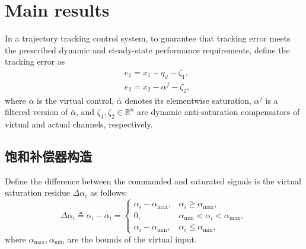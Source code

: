 \documentclass[pdflatex,sn-mathphys-num]{sn-jnl}%
\theoremstyle{thmstyleone}%
\theoremstyle{thmstyletwo}%
\theoremstyle{thmstylethree}%
\begin{document}
\section{Main results}





\par In a trajectory tracking control system, to  guarantee that tracking error meets the prescribed dynamic and steady-state performance requirements, define the tracking error as
\begin{subequations}\label{eq:20}
	\begin{align}
		&e_{1} = x_{1} - q_{d}-\zeta_{1}, \\
	  &e_{2} = x_{2} -\alpha^{f}-\zeta_{2},
	\end{align}
	\end{subequations}
	where $\alpha$ is the virtual control, $\bar{\alpha}$ denotes its elementwise saturation, $\alpha^{f}$ is a filtered version of $\bar{\alpha}$, and $\zeta_{1},\zeta_{2}\in\mathbb{R}^{n}$ are dynamic anti-saturation compensators of virtual and actual channels, respectively.


\subsection{饱和补偿器构造}
Define the difference between the commanded and saturated signals is the virtual saturation residue $\Delta \alpha_{i}$ as follows:
\begin{equation}\label{eq:21}
	\Delta \alpha_{i}\triangleq \alpha_{i}-\bar{\alpha}_{i}=
	\begin{cases}
	\alpha_{i}-\alpha_{\max}, & \alpha_{i}\ge \alpha_{\max},\\
	0,                        & \alpha_{\min}<\alpha_{i}<\alpha_{\max},\\
	\alpha_{i}-\alpha_{\min}, & \alpha_{i}\le \alpha_{\min},
	\end{cases}
	\end{equation}
where $\alpha_{\max},\alpha_{\min}$ are the bounds of the virtual input.
\end{document}
